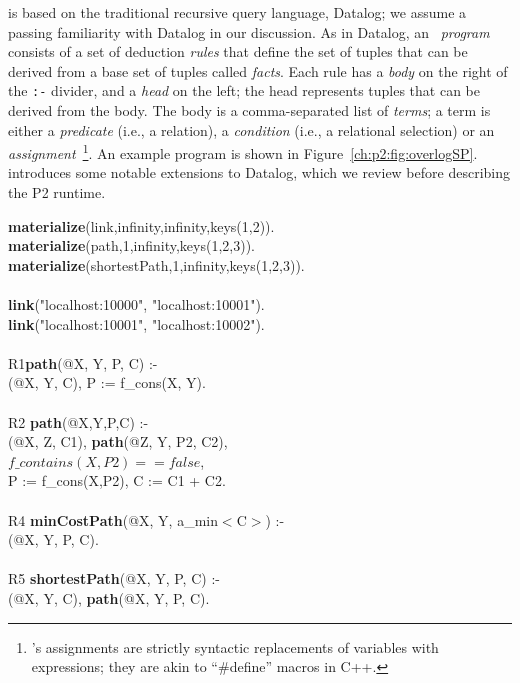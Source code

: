 \OVERLOG is based on the traditional recursive query language, Datalog; we assume a passing familiarity 
with Datalog in our discussion.  As in Datalog, an \OVERLOG~{\em program} consists of a set of deduction 
{\em rules} that define the set of tuples that can be derived from a base set of tuples called {\em facts}. 
Each rule has a {\em body} on the right of the \texttt{:-} divider, and a {\em head} on the left; the head 
represents tuples that can be derived from the body.  The body is a comma-separated list of {\em terms}; 
a term is either a {\em predicate} (i.e., a relation), a {\em condition} (i.e., a relational selection) or an 
{\em assignment}~\footnote{\OVERLOG's assignments are strictly syntactic replacements of variables with 
expressions; they are akin to ``\#define'' macros in C++.}.  An example \OVERLOG program is shown in 
Figure~\ref{ch:p2:fig:overlogSP}.  \OVERLOG introduces some notable extensions to Datalog, which we review
before describing the P2 runtime.

\begin{figure*}
\ssp
\begin{boxedminipage}{\linewidth}
{\bf materialize}(link,infinity,infinity,keys(1,2)). \\
{\bf materialize}(path,1,infinity,keys(1,2,3)).  \\
{\bf materialize}(shortestPath,1,infinity,keys(1,2,3)). \\
\\
{\bf link}("localhost:10000", "localhost:10001"). \\
{\bf link}("localhost:10001", "localhost:10002"). \\
\\
R1{\bf path}(@X, Y, P, C) :- \\
(@X, Y, C), P := f\_cons(X, Y). \\
\\       
R2 {\bf path}(@X,Y,P,C) :- \\
(@X, Z, C1), {\bf path}(@Z, Y, P2, C2), \\
\datalogspace $f\_contains(X,P2) == false$, \\
\datalogspace P := f\_cons(X,P2), C := C1 + C2. \\ 
\\      
R4 {\bf minCostPath}(@X, Y, a\_min$<$C$>$) :-  \\
(@X, Y, P, C). \\
\\
R5 {\bf shortestPath}(@X, Y, P, C) :- \\
(@X, Y, C), {\bf path}(@X, Y, P, C).\\
\end{boxedminipage}
\caption{\label{ch:p2:fig:overlogSP}Shortest path program in \OVERLOG. 
prefixes introduce aggregate functions and  prefixes introduce
built-in functions.}
\end{figure*}

